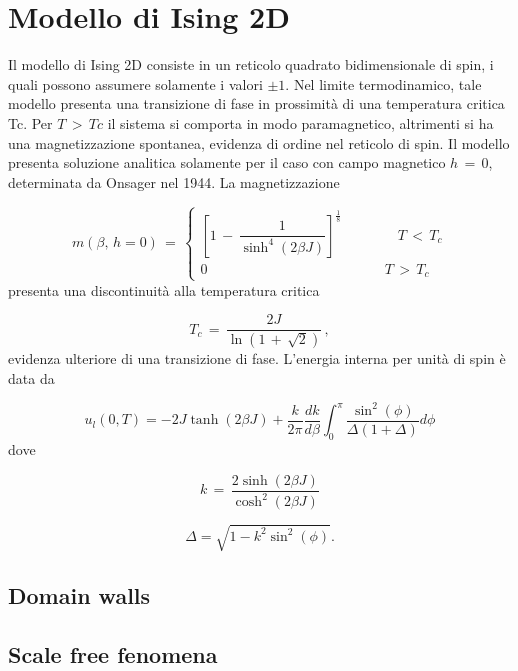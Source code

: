 \section{Modello di Ising 2D}

Il modello di Ising 2D consiste in un reticolo quadrato bidimensionale di spin, i quali possono assumere solamente i valori 
$\pm 1$. Nel limite termodinamico, tale modello presenta una transizione di fase in prossimità di una temperatura critica Tc.
Per $T\,>\,Tc$ il sistema si comporta in modo paramagnetico, altrimenti si ha una magnetizzazione spontanea, evidenza 
di ordine nel reticolo di spin. Il modello presenta soluzione analitica solamente per il caso con campo magnetico $h\,=\,0$, 
determinata da Onsager nel 1944. La magnetizzazione 

\begin{equation}
    m\left(\beta,\,h=0\right)\,=\,
    \begin{cases}
    \left[1\,-\,\dfrac{1}{\sinh^4{\left(2\beta J\right)}}\right]^{\frac{1}{8}} \qquad \qquad T\,<\,T_c \\
    0 \qquad \qquad \qquad \qquad \qquad \qquad \,\,\,\, T\,>\,T_c
    \end{cases}
    \label{eq: magn_Onsager_1944}
\end{equation}
presenta una discontinuità alla temperatura critica 

\begin{equation}
    T_c\,=\,\frac{2J}{\ln{\left(1\,+\,\sqrt{2}\right)}}\,,
    \label{eq: tc_Ising2D_Ons}
\end{equation}
evidenza ulteriore di una transizione di fase. L'energia interna per unità di spin è data da 

\begin{equation}
    u_l(0, T) = -2J \tanh(2\beta J) + \frac{k}{2\pi} \frac{dk}{d\beta} \int_{0}^{\pi} 
    \frac{\sin^2(\phi)}{\Delta (1 + \Delta)} d\phi
    \label{eq: ene_Onsager_1944}
\end{equation}
dove

\begin{equation}
    k\,=\,\frac{2 \sinh{\left(2 \beta J\right)}}{\cosh^2{\left(2\beta J\right)}}
    \label{eq: k_Ising2D_Ons}
\end{equation}

\begin{equation}
    \Delta = \sqrt{1 - k^2 \sin^2(\phi)}.
    \label{eq: Delta_Ising2D_Ons}
\end{equation}



\subsection{Domain walls}

\subsection{Scale free fenomena}



